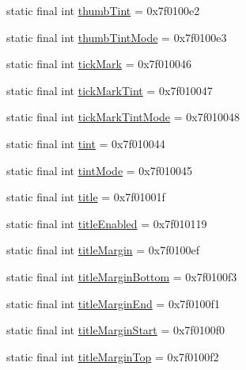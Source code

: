\begin{CompactItemize}
\item 
static final int \hyperlink{classandroid_1_1support_1_1v7_1_1appcompat_1_1_r_1_1attr_44933ee552fa399abbcbe4d21c436b9e}{thumbTint} = 0x7f0100e2
\item 
static final int \hyperlink{classandroid_1_1support_1_1v7_1_1appcompat_1_1_r_1_1attr_bc3b32dc3bd9827f3e616a3a03d000a2}{thumbTintMode} = 0x7f0100e3
\item 
static final int \hyperlink{classandroid_1_1support_1_1v7_1_1appcompat_1_1_r_1_1attr_49afaba54ed0dd18144f501b63fd84a5}{tickMark} = 0x7f010046
\item 
static final int \hyperlink{classandroid_1_1support_1_1v7_1_1appcompat_1_1_r_1_1attr_0184f20d22fbdfbc8e2acb934d0d2a5d}{tickMarkTint} = 0x7f010047
\item 
static final int \hyperlink{classandroid_1_1support_1_1v7_1_1appcompat_1_1_r_1_1attr_bd56a899495054c7ab47dcd1047ed2c0}{tickMarkTintMode} = 0x7f010048
\item 
static final int \hyperlink{classandroid_1_1support_1_1v7_1_1appcompat_1_1_r_1_1attr_8dcc08b0ca1bf472199c2d29cf9c00fa}{tint} = 0x7f010044
\item 
static final int \hyperlink{classandroid_1_1support_1_1v7_1_1appcompat_1_1_r_1_1attr_b82622a91200a37956c3f1afa0a1412f}{tintMode} = 0x7f010045
\item 
static final int \hyperlink{classandroid_1_1support_1_1v7_1_1appcompat_1_1_r_1_1attr_fce526573a83130ba5da509c3d2bdb7b}{title} = 0x7f01001f
\item 
static final int \hyperlink{classandroid_1_1support_1_1v7_1_1appcompat_1_1_r_1_1attr_fea3dd32d41218df5a2f85598ddfba61}{titleEnabled} = 0x7f010119
\item 
static final int \hyperlink{classandroid_1_1support_1_1v7_1_1appcompat_1_1_r_1_1attr_a954552e278c499393c9f4eda1414a2e}{titleMargin} = 0x7f0100ef
\item 
static final int \hyperlink{classandroid_1_1support_1_1v7_1_1appcompat_1_1_r_1_1attr_9128f48f3058b589aaf068134845268c}{titleMarginBottom} = 0x7f0100f3
\item 
static final int \hyperlink{classandroid_1_1support_1_1v7_1_1appcompat_1_1_r_1_1attr_a0c53e6790f3a4fd0b6b8a598b86feac}{titleMarginEnd} = 0x7f0100f1
\item 
static final int \hyperlink{classandroid_1_1support_1_1v7_1_1appcompat_1_1_r_1_1attr_8a25f4fb1e1c4eba38d0d495bd79b72f}{titleMarginStart} = 0x7f0100f0
\item 
static final int \hyperlink{classandroid_1_1support_1_1v7_1_1appcompat_1_1_r_1_1attr_a1417805ecd96a1a835b5048e526ae7d}{titleMarginTop} = 0x7f0100f2

\end{CompactItemize}
